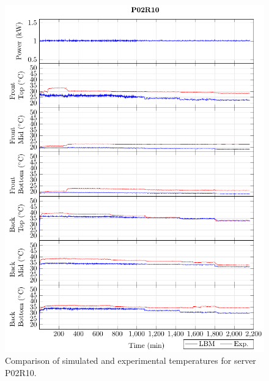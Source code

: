 \begin{figure}[!htb]
\centering
\includegraphics[width=\linewidth]{Plots/P02R10_T.pdf}
\caption{Comparison of simulated and experimental temperatures for server P02R10.}
\label{fig:P02R10_plot}
\end{figure}

\clearpage
